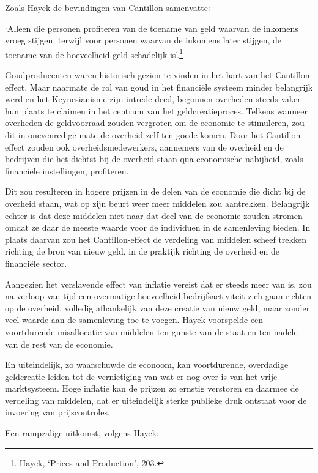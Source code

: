 \documentclass[smalldemyvopaper,11pt,twoside,onecolumn,openright,extrafontsizes,hidelinks]{memoir}
\begin{document}
Zoals Hayek de bevindingen van Cantillon samenvatte:

`Alleen die personen profiteren van de toename van geld waarvan de
inkomens vroeg stijgen, terwijl voor personen waarvan de inkomens later
stijgen, de toename van de hoeveelheid geld schadelijk is'.\footnote{\hspace{0pt}Hayek,
  `Prices and Production', 203.}

Goudproducenten waren historisch gezien te vinden in het hart van het
Cantillon-effect. Maar naarmate de rol van goud in het financiële
systeem minder belangrijk werd en het Keynesianisme zijn intrede deed,
begonnen overheden steeds vaker hun plaats te claimen in het centrum van
het geldcreatieproces. Telkens wanneer overheden de geldvoorraad zouden
vergroten om de economie te stimuleren, zou dit in onevenredige mate de
overheid zelf ten goede komen. Door het Cantillon-effect zouden ook
overheidsmedewerkers, aannemers van de overheid en de bedrijven die het
dichtst bij de overheid staan qua economische nabijheid, zoals
financiële instellingen, profiteren.

Dit zou resulteren in hogere prijzen in de delen van de economie die
dicht bij de overheid staan, wat op zijn beurt weer meer middelen zou
aantrekken. Belangrijk echter is dat deze middelen niet naar dat deel
van de economie zouden stromen omdat ze daar de meeste waarde voor de
individuen in de samenleving bieden. In plaats daarvan zou het
Cantillon-effect de verdeling van middelen scheef trekken richting de
bron van nieuw geld, in de praktijk richting de overheid en de
financiële sector.

Aangezien het verslavende effect van inflatie vereist dat er steeds meer
van is, zou na verloop van tijd een overmatige hoeveelheid
bedrijfsactiviteit zich gaan richten op de overheid, volledig
afhankelijk van deze creatie van nieuw geld, maar zonder veel waarde aan
de samenleving toe te voegen. Hayek voorspelde een voortdurende
misallocatie van middelen ten gunste van de staat en ten nadele van de
rest van de economie.

En uiteindelijk, zo waarschuwde de econoom, kan voortdurende, overdadige
geldcreatie leiden tot de vernietiging van wat er nog over is van het
vrije-marktsysteem. Hoge inflatie kan de prijzen zo ernstig verstoren en
daarmee de verdeling van middelen, dat er uiteindelijk sterke publieke
druk ontstaat voor de invoering van prijscontroles.

Een rampzalige uitkomst, volgens Hayek:
\end{document}

